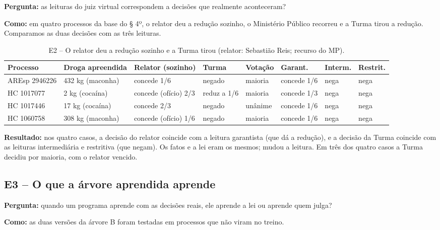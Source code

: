 \textbf{Pergunta:} as leituras do juiz virtual correspondem a decisões que realmente
aconteceram?

\textbf{Como:} em quatro processos da base do § 4º, o relator deu a redução sozinho, o
Ministério Público recorreu e a Turma tirou a redução. Comparamos as duas decisões com
as três leituras.

\begin{table}[h]
\centering\small
\caption{E2 -- O relator deu a redução sozinho e a Turma tirou (relator: Sebastião Reis; recurso do MP).}
\label{tab:e2}
\begin{adjustbox}{max width=\textwidth}
\begin{tabular}{llllllll}
\toprule
Processo & Droga apreendida & Relator (sozinho) & Turma & Votação & Garant. & Interm. & Restrit. \\
\midrule
AREsp 2946226 & 432 kg (maconha) & concede 1/6 & negado & maioria & concede 1/6 & nega & nega \\
HC 1017077 & 2 kg (cocaína) & concede (ofício) 2/3 & reduz a 1/6 & maioria & concede 1/3 & nega & nega \\
HC 1017446 & 17 kg (cocaína) & concede 2/3 & negado & unânime & concede 1/6 & nega & nega \\
HC 1060758 & 308 kg (maconha) & concede (ofício) 1/6 & negado & maioria & concede 1/6 & nega & nega \\
\bottomrule
\end{tabular}
\end{adjustbox}
\end{table}

\textbf{Resultado:} nos quatro casos, a decisão do relator coincide com a leitura
garantista (que dá a redução), e a decisão da Turma coincide com as leituras intermediária
e restritiva (que negam). Os fatos e a lei eram os mesmos; mudou a leitura. Em três dos
quatro casos a Turma decidiu por maioria, com o relator vencido.

\subsection*{E3 -- O que a árvore aprendida aprende}

\textbf{Pergunta:} quando um programa aprende com as decisões reais, ele aprende a lei ou
aprende quem julga?

\textbf{Como:} as duas versões da árvore B foram testadas em processos que não viram no
treino.

